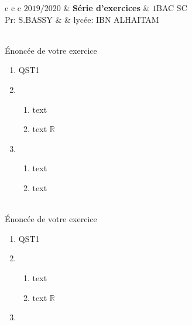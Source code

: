 \documentclass[12pt,a4paper]{report}
\begin{document}
	
		\begin{tcolorbox}[enhanced,frame style={left color=yellow,right color=green},interior style={fill=none,
			top color=green!30!white,
			bottom color=yellow!20!white}]
		\begin{center}
			\begin{tabular}{c c  c}
				$2019/2020$ 	\hspace*{2cm}   &  {\textbf{{\Large Série d'exercices}}} & 	\hspace*{2cm} $1$BAC SC			\\
				Pr: S.BASSY\hspace*{2cm} &  & \hspace*{1cm}lycée: IBN ALHAITAM
			\end{tabular}
		\end{center}
	\end{tcolorbox}
	\vspace*{0.5cm}
	
	\begin{exercise}
	\\	Énoncée de votre exercice 
		
		\begin{enumerate}
			\item  QST1
			\item \begin{enumerate}
				\item text
				\item  text $\mathbb{R}$
				   
			\end{enumerate}
			
			\item \begin{enumerate}
				
				\item text
				\item text
			\end{enumerate}
		\end{enumerate}
%	
	\end{exercise}
	
	


	\vspace*{0.5cm}
\begin{exercise}
	\\	Énoncée de votre exercice 

\begin{enumerate}
	\item  QST1
	\item \begin{enumerate}
		\item text
		\item  text $\mathbb{R}$
		
	\end{enumerate}
	
	\item
	\end{enumerate}

%	
\end{exercise}
\end{document}
